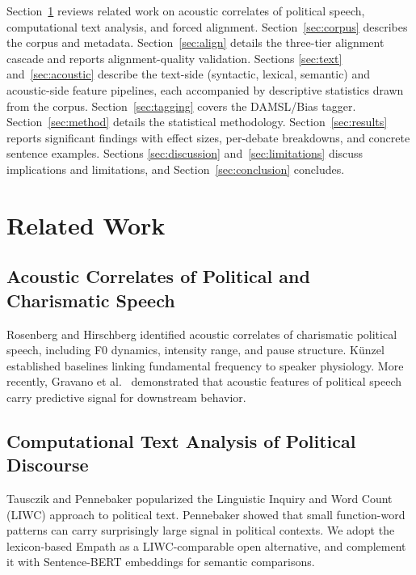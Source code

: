 \documentclass[journal]{IEEEtran}
\begin{document}
Section~\ref{sec:related} reviews related work on acoustic correlates
of political speech, computational text analysis, and forced
alignment. Section~\ref{sec:corpus} describes the corpus and
metadata. Section~\ref{sec:align} details the three-tier alignment
cascade and reports alignment-quality validation. Sections
\ref{sec:text} and~\ref{sec:acoustic} describe the text-side
(syntactic, lexical, semantic) and acoustic-side feature pipelines,
each accompanied by descriptive statistics drawn from the corpus.
Section~\ref{sec:tagging} covers the DAMSL/Bias tagger.
Section~\ref{sec:method} details the statistical methodology.
Section~\ref{sec:results} reports significant findings with effect
sizes, per-debate breakdowns, and concrete sentence examples.
Sections \ref{sec:discussion} and~\ref{sec:limitations} discuss
implications and limitations, and Section~\ref{sec:conclusion}
concludes.

\section{Related Work}
\label{sec:related}

\subsection{Acoustic Correlates of Political and Charismatic Speech}
Rosenberg and Hirschberg \cite{rosenberg2009acoustic} identified
acoustic correlates of charismatic political speech, including F0
dynamics, intensity range, and pause structure. K\"unzel
\cite{kunzel1989speakers} established baselines linking fundamental
frequency to speaker physiology. More recently, Gravano et al.\
\cite{hutto2018political} demonstrated that acoustic features of
political speech carry predictive signal for downstream behavior.

\subsection{Computational Text Analysis of Political Discourse}
Tausczik and Pennebaker \cite{tausczik2010psychological} popularized
the Linguistic Inquiry and Word Count (LIWC) approach to political
text. Pennebaker \cite{pennebaker2014small} showed that small
function-word patterns can carry surprisingly large signal in political
contexts. We adopt the lexicon-based Empath \cite{fast2016empath} as a
LIWC-comparable open alternative, and complement it with Sentence-BERT
\cite{reimers2019sbert} embeddings for semantic comparisons.
\end{document}
